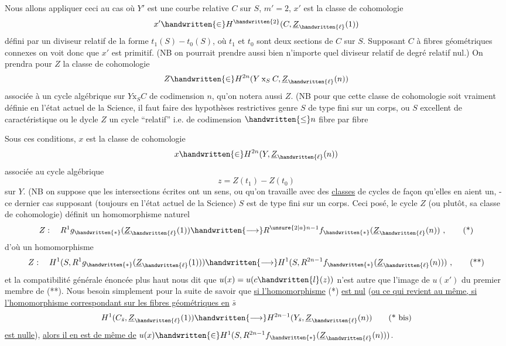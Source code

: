 Nous allons appliquer ceci au cas où $Y'$ est une courbe relative $C$ sur $S$, $m'=2$, $x'$ est la classe de cohomologie
\[
x'\handwritten{\in}H^{\handwritten{2}}(C,\underline{Z}_{\handwritten{\ell}}(1))
\]
défini par un diviseur relatif de la forme $t_1(S)-t_0(S)$, où $t_1$ et $t_0$ sont deux sections de $C$ sur $S$. Supposant $C$ à fibres géométriques connexes on voit donc que $x'$ est primitif. (NB on pourrait prendre aussi bien n'importe quel diviseur relatif de degré relatif nul.) On prendra pour $Z$ la classe de cohomologie
\[
Z\handwritten{\in}H^{2n}(Y\mathbin{\mathrm{x}}_S C,\underline{Z}_{\handwritten{\ell}}(n))
\]
associée à un cycle algébrique sur $Y\mathbin{\mathrm{x}}_S C$ de codimension $n$, qu'on notera aussi $Z$. (NB pour que cette classe de cohomologie soit vraiment définie en l'état actuel de la Science, il faut faire des hypothèses restrictives genre $S$ de type fini sur un corps, ou $S$ excellent de caractéristique  ou le dycle $Z$ un cycle ``relatif'' i.e. de codimension $\handwritten{\leq}n$ fibre par fibre

Sous ces conditions, $x$ est la classe de cohomologie
\[
x\handwritten{\in}H^{2n}(Y,\underline{Z}_{\handwritten{\ell}}(n))
\]
associée au cycle algébrique
\[
z=Z(t_1)-Z(t_0)
\]
sur $Y$. (NB on suppose que les intersections écrites ont un sens, ou qu'on travaille avec des \uline{classes} de cycles de façon qu'elles en aient un, - ce dernier cas supposant (toujours en l'état actuel de la Science)  $S$ est de type fini sur un corps.
Ceci posé, le cycle $Z$ (ou plutôt, sa classe de cohomologie) définit un homomorphisme naturel
\[
Z:\quad R^1g_{\handwritten{*}}(\underline{Z}_{\handwritten{\ell}}(1))\handwritten{\longrightarrow}R^{\unsure{2|a}n-1}f_{\handwritten{*}}(\underline{Z}_{\handwritten{\ell}}(n))\ ,\tag*{(*)}
\]
d'où un homomorphisme
\[
Z:\quad H^1(S,R^1g_{\handwritten{*}}(\underline{Z}_{\handwritten{\ell}}(1)))\handwritten{\longrightarrow}H^1(S,R^{2n-1}f_{\handwritten{*}}(\underline{Z}_{\handwritten{\ell}}(n)))\ ,\tag*{(**)}
\]
et la compatibilité générale énoncée plus haut nous dit que $u(x)=u(c\handwritten{l}(z))$ n'est autre que l'image de $u(x')$ du premier membre de  (**). Nous  besoin simplement pour la suite de savoir que \uline{si l'homomorphisme} (*) \uline{est nul} (\uline{ou ce qui revient au même, si l'homomorphisme correspondant sur les fibres géométriques en} $\bar s$ 
\[
H^1(C_{\bar s},\underline{Z}_{\handwritten{\ell}}(1))\handwritten{\longrightarrow}H^{2n-1}(Y_{\bar s},\underline{Z}_{\handwritten{\ell}}(n))\tag*{(* bis)}
\]
\uline{est nulle}), \uline{alors il en est de même de} $u(x)\handwritten{\in}H^1(S,R^{2n-1}f_{\handwritten{*}}(\underline{Z}_{\handwritten{\ell}}(n)))$.

